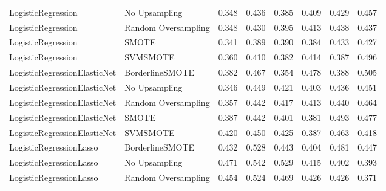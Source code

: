 \begin{tabular}{llllllll}
          LogisticRegression &       No Upsampling & 0.348 &                     0.436 &                 0.385 &                  0.409 &                                   0.429 &    0.457 \\
          LogisticRegression & Random Oversampling & 0.348 &                     0.430 &                 0.395 &                  0.413 &                                   0.438 &    0.437 \\
          LogisticRegression &               SMOTE & 0.341 &                     0.389 &                 0.390 &                  0.384 &                                   0.433 &    0.427 \\
          LogisticRegression &            SVMSMOTE & 0.360 &                     0.410 &                 0.382 &                  0.414 &                                   0.387 &    0.496 \\
LogisticRegressionElasticNet &     BorderlineSMOTE & 0.382 &                     0.467 &                 0.354 &                  0.478 &                                   0.388 &    0.505 \\
LogisticRegressionElasticNet &       No Upsampling & 0.346 &                     0.449 &                 0.421 &                  0.403 &                                   0.436 &    0.451 \\
LogisticRegressionElasticNet & Random Oversampling & 0.357 &                     0.442 &                 0.417 &                  0.413 &                                   0.440 &    0.464 \\
LogisticRegressionElasticNet &               SMOTE & 0.387 &                     0.442 &                 0.401 &                  0.381 &                                   0.493 &    0.477 \\
LogisticRegressionElasticNet &            SVMSMOTE & 0.420 &                     0.450 &                 0.425 &                  0.387 &                                   0.463 &    0.418 \\
     LogisticRegressionLasso &     BorderlineSMOTE & 0.432 &                     0.528 &                 0.443 &                  0.404 &                                   0.481 &    0.447 \\
     LogisticRegressionLasso &       No Upsampling & 0.471 &                     0.542 &                 0.529 &                  0.415 &                                   0.402 &    0.393 \\
     LogisticRegressionLasso & Random Oversampling & 0.454 &                     0.524 &                 0.469 &                  0.426 &                                   0.426 &    0.371 \\

\end{tabular}
